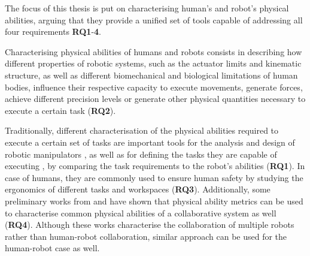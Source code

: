 


The focus of this thesis is put on characterising human's and robot's physical abilities, arguing that they provide a unified set of tools capable of addressing all four requirements \textbf{RQ1}-\textbf{4}.

Characterising physical abilities of humans and robots consists in describing how different properties of robotic systems, such as the actuator limits and kinematic structure, as well as different biomechanical and biological limitations of human bodies, influence their respective capacity to execute movements, generate forces, achieve different precision levels or generate other physical quantities necessary to execute a certain task (\textbf{RQ2}).

Traditionally, different characterisation of the physical abilities required to execute a certain set of tasks are important tools for the analysis and design of robotic manipulators \cite{patel2015manipulator}, as well as for defining the tasks they are capable of executing \cite{Pholsiri2015task}, by comparing the task requirements to the robot's abilities (\textbf{RQ1}). In case of humans, they are commonly used to ensure human safety by studying the ergonomics of different tasks and workspaces \cite{Golabchi2015} (\textbf{RQ3}). Additionally, some preliminary works from \citet{chiacchio_global_1991} and \citet{lee2001velocity} have shown that physical ability metrics can be used to characterise common physical abilities of a collaborative system as well (\textbf{RQ4}). Although these works characterise the collaboration of multiple robots rather than human-robot collaboration, similar approach can be used for the human-robot case as well.

